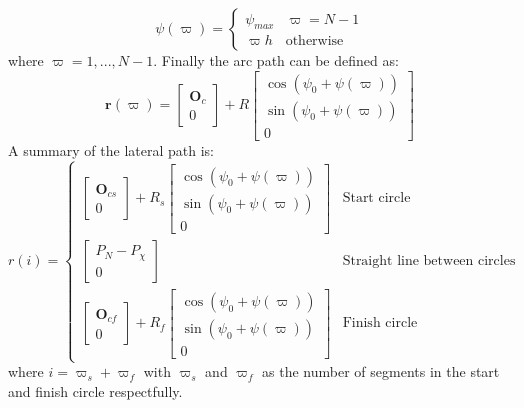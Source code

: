 \begin{equation}
\psi(\varpi) = \begin{cases}
\psi_{max} & \varpi = N-1 \\
\varpi h & \text{otherwise}
\end{cases}
\end{equation}
where $\varpi = 1,...,N-1$. Finally the arc path can be defined as:
\begin{equation}
\mathbf{r}(\varpi) = \begin{bmatrix}
\mathbf{O}_c \\
0
\end{bmatrix} + R\begin{bmatrix}
\cos(\psi_0 + \psi(\varpi)) \\
\sin(\psi_0 + \psi(\varpi)) \\
0
\end{bmatrix}
\end{equation}
A summary of the lateral path is:
\begin{equation}
r(i) = \begin{cases}
\begin{bmatrix}
\mathbf{O}_{cs} \\
0
\end{bmatrix} + R_s\begin{bmatrix}
\cos(\psi_{0} + \psi(\varpi)) \\
\sin(\psi_{0} + \psi(\varpi)) \\
0
\end{bmatrix} & \text{Start circle} \\
\begin{bmatrix}
P_N - P_\chi \\
0
\end{bmatrix} & \text{Straight line between circles} \\
\begin{bmatrix}
\mathbf{O}_{cf} \\
0
\end{bmatrix} + R_f\begin{bmatrix}
\cos(\psi_{0} + \psi(\varpi)) \\
\sin(\psi_{0} + \psi(\varpi)) \\
0
\end{bmatrix} & \text{Finish circle}
\end{cases}
\end{equation}
where $i = \varpi_s + \varpi_f$ with $\varpi_s$ and $\varpi_f$ as the number of segments in the start and finish circle respectfully.  
